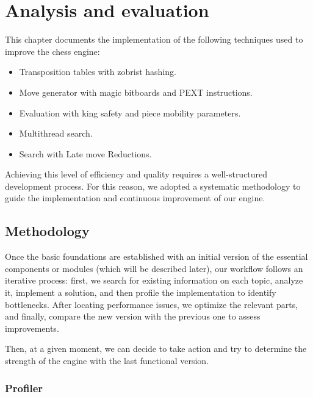 \chapter{Analysis and evaluation}\label{cap:analysis}

This chapter documents the implementation of the following techniques used to improve the chess engine:

\begin{itemize}[itemsep=1pt]
    \item Transposition tables with zobrist hashing.
    \item Move generator with magic bitboards and PEXT instructions.
    \item Evaluation with king safety and piece mobility parameters.
    \item Multithread search.
    \item Search with Late move Reductions.
\end{itemize}


\newpage

\noindent Achieving this level of efficiency and quality requires a well-structured development process. For this reason, we adopted a systematic methodology to guide the implementation and continuous improvement of our engine.

\section{Methodology}

Once the basic foundations are established with an initial version of the essential components or modules (which will be described later), our workflow follows an iterative process: first, we search for existing information on each topic, analyze it, implement a solution, and then profile the implementation to identify bottlenecks. After locating performance issues, we optimize the relevant parts, and finally, compare the new version with the previous one to assess improvements.

\vspace{1em}

\noindent Then, at a given moment, we can decide to take action and try to determine the strength of the engine with the last functional version.

\subsection*{Profiler}

